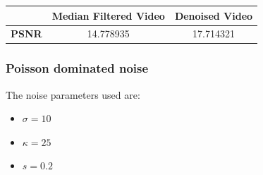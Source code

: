\documentclass{article}
\begin{document}
\begin{table}[H]
    \begin{tabular}{|c|c|c|}
    \hline
    \textbf{ }     & Median Filtered Video & Denoised Video  \\
    \hline
    \textbf{PSNR} & 14.778935             & 17.714321   \\ 
    \hline
\end{tabular}
\end{table}

\newpage
\subsubsection*{Poisson dominated noise}
The noise parameters used are: \\
\begin{itemize}
    \item $\sigma = 10$
    \item $\kappa = 25$
    \item $s = 0.2$
\end{itemize}
\end{document}
